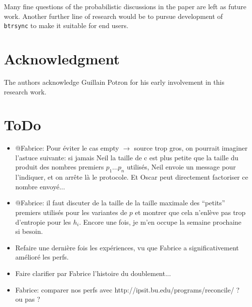\documentclass[11pt]{llncs}
\newcommand{\btrsync}{\texttt{btrsync}\xspace}
\newcommand{\comm}[1]{\marginpar{%
\vskip-\baselineskip %
\raggedright\footnotesize
\itshape\hrule\smallskip#1\par\smallskip\hrule}}
\begin{document}
Many fine questions of the probabilistic discussions in the paper are left as future work.\comm{Be more specific!} Another further line of research would be to pursue development of \btrsync to make it suitable for end users.

\section{Acknowledgment}

The authors acknowledge Guillain Potron for his early involvement in this research work.\smallskip

\section{ToDo}

\begin{itemize}

\item @Fabrice: Pour éviter le cas empty $\rightarrow$ source trop gros, on pourrait imaginer l'astuce suivante: si jamais Neil la taille de c est plus petite que la taille du produit des nombres premiers $p_1$...$p_n$ utilisés, Neil envoie un message pour l'indiquer, et on arr\^ete là le protocole. Et Oscar peut directement factoriser ce nombre envoyé...

\item @Fabrice: il faut discuter de la taille de la taille maximale des ``petits'' premiers utilisés pour les variantes de $p$ et montrer que cela n'enlève pas trop d'entropie pour les $h_i$. Encore une fois, je m'en occupe la semaine prochaine si besoin.

\item Refaire une dernière fois les expériences, vu que Fabrice a significativement amélioré les perfs.

\item Faire clarifier par Fabrice l'histoire du doublement...

\item Fabrice: comparer nos perfs avec http://ipsit.bu.edu/programs/reconcile/ ? ou pas ?

\end{itemize}

\nocite{rsync}
\nocite{wagner}
\end{document}
